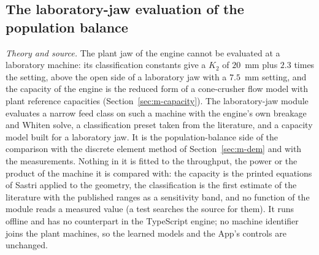 \subsection{The laboratory-jaw evaluation of the population balance}\label{sec:m-labjaw}

\emph{Theory and source.} The plant jaw of the engine cannot be evaluated at a laboratory machine: its classification constants give a $K_2$ of $20$~mm plus $2.3$ times the setting, above the open side of a laboratory jaw with a $7.5$~mm setting, and the capacity of the engine is the reduced form of a cone-crusher flow model
with plant reference capacities (Section~\ref{sec:m-capacity}). The laboratory-jaw module evaluates a narrow feed class on such a machine with the engine's own breakage and Whiten solve, a classification preset taken from the literature, and a capacity model built for a laboratory jaw. It is the population-balance side of the comparison with the discrete element method of Section~\ref{sec:m-dem} and with the measurements.
Nothing in it is fitted to the throughput, the power or the product of the machine it is compared with: the capacity is the printed equations of Sastri applied to the geometry, the classification is the first estimate of the literature with the published ranges as a sensitivity band, and no function of the module reads a measured value (a test searches the source for them). It runs offline and has no counterpart in the TypeScript engine; no machine identifier joins the plant machines, so the learned models and the App's controls are unchanged.

